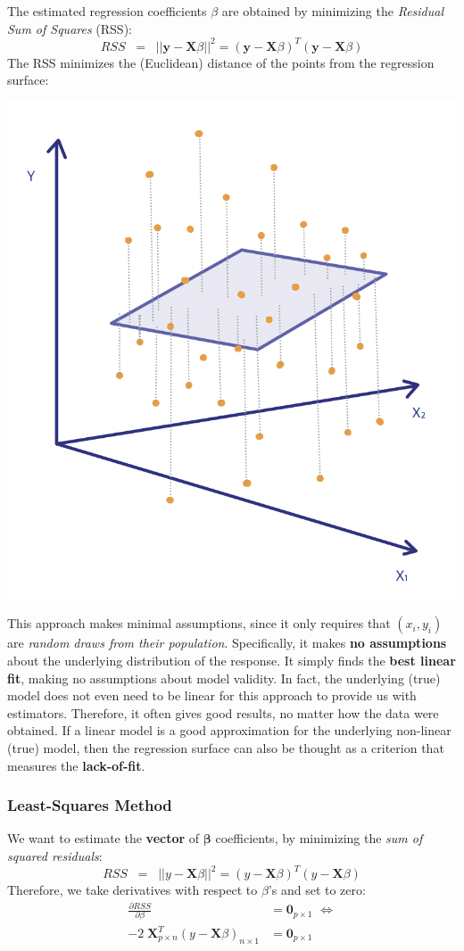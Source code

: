 \documentclass[
]{book}
\begin{document}
The estimated regression coefficients \(\beta\) are obtained by minimizing the \emph{Residual Sum of Squares} (RSS):
\[RSS \;\;=\;\; ||\mathbf{y} - \mathbf{X} \beta||^2 = (\mathbf{y} - \mathbf{X} \beta)^{T} (\mathbf{y} - \mathbf{X}\beta)\]
The RSS minimizes the (Euclidean) distance of the points from the regression surface:

\begin{center}\includegraphics[width=0.4\linewidth]{images/week2/lsreg} \end{center}

This approach makes minimal assumptions, since it only requires that \((x_i, y_i)\) are \emph{random draws from their population}. Specifically, it makes \textbf{no assumptions} about the underlying distribution of the response. It simply finds the \textbf{best linear fit}, making no assumptions about model validity. In fact, the underlying (true) model does not even need to be linear for this approach to provide us with estimators. Therefore, it often gives good results, no matter how the data were obtained. If a linear model is a good approximation for the underlying non-linear (true) model, then the regression surface can also be thought as a criterion that measures the \textbf{lack-of-fit}.

\subsubsection*{Least-Squares Method}\label{least-squares-method-1}

We want to estimate the \textbf{vector} of \(\mathbf{\beta}\) coefficients, by minimizing the \emph{sum of squared residuals}:
\[RSS\;\;=\;\; ||y - \mathbf{X} \beta||^2 = (y - \mathbf{X} \beta)^{T} (y - \mathbf{X}\beta)\]
Therefore, we take derivatives with respect to \(\beta\)'s and set to zero:
\begin{align*}
\frac{\partial RSS}{\partial \beta}  &= \mathbf{0}_{p\times 1} \,\, \Leftrightarrow \\
-2 \;\mathbf{X}^T_{p\times n} (y - \mathbf{X}\beta)_{n\times 1} &= \mathbf{0}_{p\times 1}
\end{align*}
\end{document}
